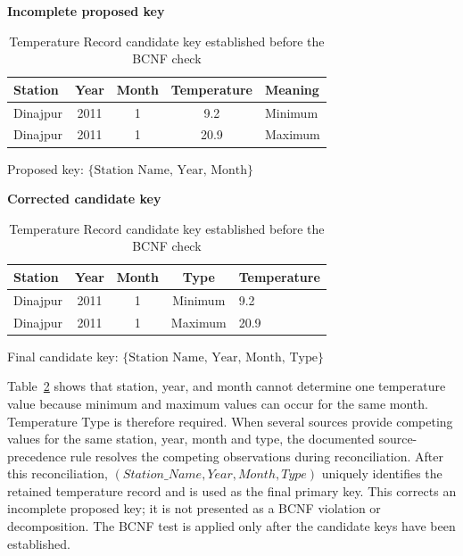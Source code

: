 \begin{table}[H]
\centering
\caption{Temperature Record candidate key established before the BCNF check}
\label{tab:bcnf-example}
\small
\renewcommand{\arraystretch}{1.2}

\textbf{Incomplete proposed key}\\[2mm]

\begin{tabular}{@{}lcccl@{}}
\toprule
\textbf{Station} &
\textbf{Year} &
\textbf{Month} &
\textbf{Temperature} &
\textbf{Meaning} \\
\midrule
Dinajpur & 2011 & 1 & 9.2  & Minimum \\
Dinajpur & 2011 & 1 & 20.9 & Maximum \\
\bottomrule
\end{tabular}

\vspace{2mm}

\begin{flushleft}
Proposed key:
\(\{\text{Station Name, Year, Month}\}\)
\end{flushleft}

\vspace{3mm}

\textbf{Corrected candidate key}\\[2mm]

\begin{tabular}{@{}lcccl@{}}
\toprule
\textbf{Station} &
\textbf{Year} &
\textbf{Month} &
\textbf{Type} &
\textbf{Temperature} \\
\midrule
Dinajpur & 2011 & 1 & Minimum & 9.2 \\
Dinajpur & 2011 & 1 & Maximum & 20.9 \\
\bottomrule
\end{tabular}

\vspace{2mm}

\begin{flushleft}
Final candidate key:
\(\{\text{Station Name, Year, Month, Type}\}\)
\end{flushleft}
\end{table}

Table~\ref{tab:bcnf-example} shows that station, year, and month cannot
determine one temperature value because minimum and maximum values can occur
for the same month. Temperature Type is therefore required. When several
sources provide competing values for the same station, year, month and type,
the documented source-precedence rule resolves the competing observations
during reconciliation. After this reconciliation,
\((Station\_Name, Year, Month, Type)\) uniquely identifies the retained
temperature record and is used as the final primary key. This corrects an
incomplete proposed key; it is not presented as a BCNF violation or
decomposition. The BCNF test is applied only after the candidate keys have been
established.

